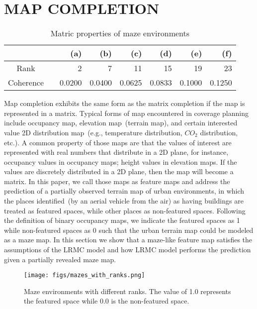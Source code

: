 \section{MAP COMPLETION}
\label{sec:map_completion}

\begin{table*}%
\caption{Matric properties of maze environments} %
\centering %
\begin{tabular}{c rrrrrrr} %
\hline\hline %
  & \vline & (a) & (b) & (c) & (d) & (e) & (f)\\
\hline %
Rank & \vline & 2 & 7 & 11 & 15 & 19 & 23\\ %
Coherence & \vline & 0.0200 & 0.0400 & 0.0625 & 0.0833 & 0.1000 & 0.1250\\ %
\hline %
\end{tabular}
\label{tb:maze_prop}
\end{table*}

Map completion exhibits the same form as the matrix completion if the map is represented in a matrix. Typical forms of map encountered in coverage planning include occupancy map, elevation map~(terrain map), and certain interested value 2D distribution map~(e.g., temperature distribution, $CO_2$ distribution, etc.). A common property of those maps are that the values of interest are represented with real numbers that distribute in a 2D plane, for instance, occupancy values in occupancy maps; height values in elevation maps. If the values are discretely distributed in a 2D plane, then the map will become a matrix. In this paper, we call those maps as feature maps and address the prediction of a partially observed terrain map of urban environments, in which the places identified~(by an aerial vehicle from the air) as having buildings are treated as featured spaces, while other places as non-featured spaces. Following the definition of binary occupancy maps, we indicate the featured spaces as 1 while non-featured spaces as 0 such that the urban terrain map could be modeled as a maze map. In this section we show that a maze-like feature map satisfies the assumptions of the LRMC model and how LRMC model performs the prediction given a partially revealed maze map.

\begin{figure} \vspace{-3pt}
  \centering
  	{\label{fig:mazes_1}\texttt{[image: figs/mazes\_with\_ranks.png]}}
  \caption{\small Maze environments with different ranks. The value of 1.0 represents the featured space while 0.0 is the non-featured space.
  } \vspace{-10pt}
\label{fig:mazes_1}  
\end{figure}

